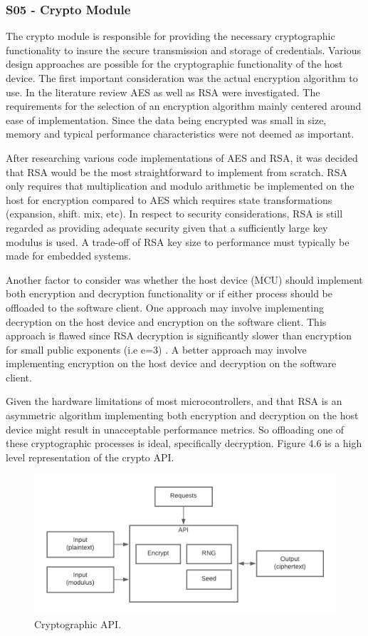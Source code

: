 \subsubsection{S05 - Crypto Module}
The crypto module is responsible for providing the necessary cryptographic functionality to insure the secure transmission and storage of credentials. Various design approaches are possible for the cryptographic functionality of the host device. The first important consideration was the actual encryption algorithm to use. In the literature review AES as well as RSA were investigated. The requirements for the selection of an encryption algorithm mainly centered around ease of implementation. Since the data being encrypted was small in size, memory and typical performance characteristics were not deemed as important.

After researching various code implementations of AES and RSA, it was decided that RSA would be the most straightforward to implement from scratch. RSA only requires that multiplication and modulo arithmetic be implemented on the host for encryption compared to AES which requires state transformations (expansion, shift. mix, etc). In respect to security considerations, RSA is still regarded as providing adequate security given that a sufficiently large key modulus is used. A trade-off of RSA key size to performance must typically be made for embedded systems.

Another factor to consider was whether the host device (MCU) should implement both encryption and decryption functionality or if either process should be offloaded to the software client. One approach may involve implementing decryption on the host device and encryption on the software client. This approach is flawed since RSA decryption is significantly slower than encryption for small public exponents (i.e e=3) \cite{rsa_speed}. A better approach may involve implementing encryption on the host device and decryption on the software client.

Given the hardware limitations of most microcontrollers, and that RSA is an asymmetric algorithm implementing both encryption and decryption on the host device might result in unacceptable performance metrics. So offloading one of these cryptographic processes is ideal, specifically decryption. Figure 4.6 is a high level representation of the crypto API. 
\begin{figure}[H]
\centering
\includegraphics[width=0.8\columnwidth]{Figures/Fig_21.png}
\caption{Cryptographic API.}
\label{fig:gantt}
\end{figure}

